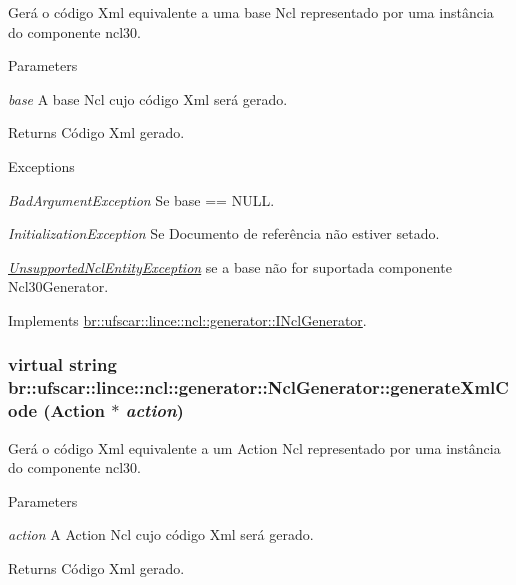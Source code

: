 Gerá o código Xml equivalente a uma base Ncl representado por uma instância do componente ncl30. 


\begin{DoxyParams}{Parameters}
\item[{\em base}]A base Ncl cujo código Xml será gerado. \end{DoxyParams}
\begin{DoxyReturn}{Returns}
Código Xml gerado. 
\end{DoxyReturn}

\begin{DoxyExceptions}{Exceptions}
\item[{\em BadArgumentException}]Se base == NULL. \item[{\em InitializationException}]Se Documento de referência não estiver setado. \item[{\em \hyperlink{classbr_1_1ufscar_1_1lince_1_1ncl_1_1generator_1_1UnsupportedNclEntityException}{UnsupportedNclEntityException}}]se a base não for suportada componente Ncl30Generator. \end{DoxyExceptions}


Implements \hyperlink{classbr_1_1ufscar_1_1lince_1_1ncl_1_1generator_1_1INclGenerator_a185d2e61f3100bcb6168c229c640e5fc}{br::ufscar::lince::ncl::generator::INclGenerator}.

\hypertarget{classbr_1_1ufscar_1_1lince_1_1ncl_1_1generator_1_1NclGenerator_abc3c9219312ca8082cce41d6e1b5fc23}{
\subsubsection[{generateXmlCode}]{\setlength{\rightskip}{0pt plus 5cm}virtual string br::ufscar::lince::ncl::generator::NclGenerator::generateXmlCode (Action $\ast$ {\em action})}}
\label{classbr_1_1ufscar_1_1lince_1_1ncl_1_1generator_1_1NclGenerator_abc3c9219312ca8082cce41d6e1b5fc23}


Gerá o código Xml equivalente a um Action Ncl representado por uma instância do componente ncl30. 


\begin{DoxyParams}{Parameters}
\item[{\em action}]A Action Ncl cujo código Xml será gerado. \end{DoxyParams}
\begin{DoxyReturn}{Returns}
Código Xml gerado. 
\end{DoxyReturn}

